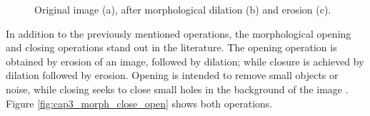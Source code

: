 \begin{figure}
  \centering
  \caption{Original image (a), after morphological dilation (b) and erosion (c).}
  \hfill
  \hfill
  \sourceOwn
  \label{fig:cap3_morph_dilat_eros}
\end{figure}

In addition to the previously mentioned operations, the morphological opening and closing operations stand out in the literature.
The opening operation is obtained by erosion of an image, followed by dilation; while closure is achieved by dilation followed by erosion.
Opening is intended to remove small objects or noise, while closing seeks to close small holes in the background of the image \cite{pedrini2008analise}.
Figure \ref{fig:cap3_morph_close_open} shows both operations.

